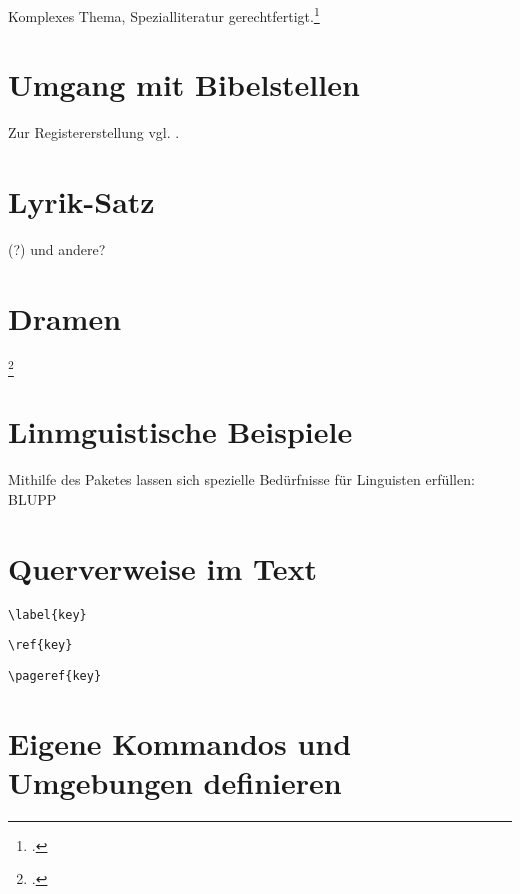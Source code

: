 Komplexes Thema, Spezialliteratur gerechtfertigt.\footcite{voss:tabellen}







\section{Umgang mit Bibelstellen}




Zur Registererstellung vgl. .


\section{Lyrik-Satz}
 

 (?) und andere?

\section{Dramen}
\footcite[xxx]{lesetypografie}


\section{Linmguistische Beispiele}

Mithilfe des Paketes  lassen sich spezielle Bedürfnisse für Linguisten erfüllen: BLUPP


\section{Querverweise im Text}


\lstinline/\label{key}/

\lstinline/\ref{key}/

\lstinline/\pageref{key}/


\section{Eigene Kommandos und Umgebungen definieren}
\label{makros}


